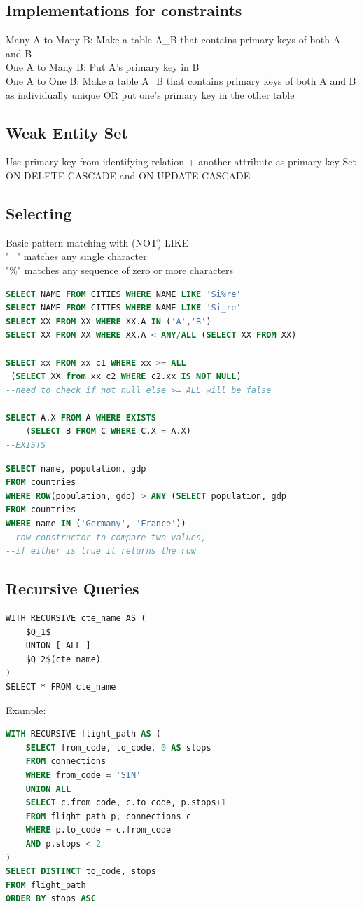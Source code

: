 \documentclass{article}
\begin{document}
\begin{multicols*}{2}
    \subsection*{Implementations for constraints}
    Many A to Many B: Make a table A{\_}B that contains primary keys of both A and B\\
    One A to Many B: Put A's primary key in B\\
    One A to One B: Make a table A{\_}B that contains primary keys of both A and B as individually unique OR put one's primary key in the other table
    \subsection*{Weak Entity Set}
    Use primary key from identifying relation + another attribute as primary key
    Set ON DELETE CASCADE and ON UPDATE CASCADE
    \subsection*{Selecting}
    Basic pattern matching with (NOT) LIKE\\
    "{\_}" matches any single character\\
    "{\%}" matches any sequence of zero or more characters
    \begin{lstlisting}[language=SQL]
SELECT NAME FROM CITIES WHERE NAME LIKE 'Si%re'
SELECT NAME FROM CITIES WHERE NAME LIKE 'Si_re'
SELECT XX FROM XX WHERE XX.A IN ('A','B')
SELECT XX FROM XX WHERE XX.A < ANY/ALL (SELECT XX FROM XX)

SELECT xx FROM xx c1 WHERE xx >= ALL
 (SELECT XX from xx c2 WHERE c2.xx IS NOT NULL)
--need to check if not null else >= ALL will be false

SELECT A.X FROM A WHERE EXISTS 
    (SELECT B FROM C WHERE C.X = A.X)
--EXISTS

\end{lstlisting}
    \begin{lstlisting}[language=SQL]
SELECT name, population, gdp
FROM countries
WHERE ROW(population, gdp) > ANY (SELECT population, gdp
FROM countries
WHERE name IN ('Germany', 'France'))
--row constructor to compare two values, 
--if either is true it returns the row
\end{lstlisting}
    \subsection*{Recursive Queries}
    \begin{lstlisting}[mathescape=true]
WITH RECURSIVE cte_name AS (
    $Q_1$
    UNION [ ALL ]
    $Q_2$(cte_name)
)
SELECT * FROM cte_name
\end{lstlisting}
    {\large Example:}
    \begin{lstlisting}[language=SQL]
WITH RECURSIVE flight_path AS (
    SELECT from_code, to_code, 0 AS stops
    FROM connections
    WHERE from_code = 'SIN'
    UNION ALL
    SELECT c.from_code, c.to_code, p.stops+1
    FROM flight_path p, connections c
    WHERE p.to_code = c.from_code
    AND p.stops < 2
)
SELECT DISTINCT to_code, stops
FROM flight_path
ORDER BY stops ASC
\end{lstlisting}

\end{multicols*}
\end{document}
